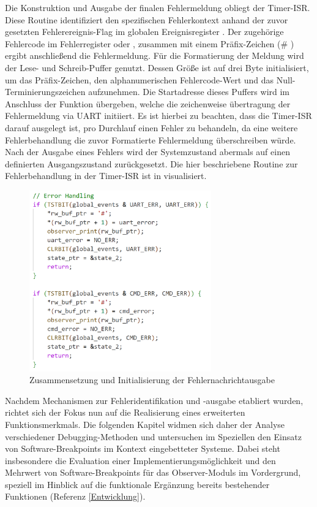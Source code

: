 \newpage
Die Konstruktion und Ausgabe der finalen Fehlermeldung obliegt der Timer-ISR. Diese Routine identifiziert den spezifischen Fehlerkontext anhand der zuvor gesetzten Fehlerereignis-Flag im globalen Ereignisregister . Der zugeh\"orige Fehlercode im Fehlerregister  oder , zusammen mit einem Pr\"afix-Zeichen (\grq \# \grq) ergibt anschlie{\ss}end die Fehlermeldung. F\"ur die Formatierung der Meldung wird der Lese- und Schreib-Puffer  genutzt. Dessen Gr\"o{\ss}e ist auf drei Byte initialisiert, um das Pr\"afix-Zeichen, den alphanumerischen Fehlercode-Wert und das Null-Terminierungszeichen aufzunehmen. Die Startadresse dieses Puffers wird im Anschluss der Funktion  \"ubergeben, welche die zeichenweise \"ubertragung der Fehlermeldung via UART initiiert. Es ist hierbei zu beachten, dass die Timer-ISR darauf ausgelegt ist, pro Durchlauf einen Fehler zu behandeln, da eine weitere Fehlerbehandlung die zuvor Formatierte Fehlermeldung \"uberschreiben w\"urde. Nach der Ausgabe eines Fehlers wird der Systemzustand abermals auf einen definierten Ausgangszustand zur\"uckgesetzt. Die hier beschriebene Routine zur Fehlerbehandlung in der Timer-ISR ist in  visualisiert.

\begin{figure}[h!]
	\centering
	\includegraphics[width=0.7\textwidth]{../Bilder/ObserverModule/Fehlerbehandlung_ISR.png}
	\caption{Zusammensetzung und Initialisierung der Fehlernachrichtausgabe}
	\label{fig:errorcode_isr}
\end{figure}

\newpage
Nachdem Mechanismen zur Fehleridentifikation und -ausgabe etabliert wurden, richtet sich der Fokus nun auf die Realisierung eines erweiterten Funktionsmerkmals. Die folgenden Kapitel widmen sich daher der Analyse verschiedener Debugging-Methoden und untersuchen im Speziellen den Einsatz von Software-Breakpoints im Kontext eingebetteter Systeme. Dabei steht insbesondere die Evaluation einer Implementierungsm\"oglichkeit und den Mehrwert von Software-Breakpoints f\"ur das Observer-Moduls im Vordergrund, speziell im Hinblick auf die funktionale Erg\"anzung bereits bestehender Funktionen (Referenz \ref{Entwicklung}).\AI

